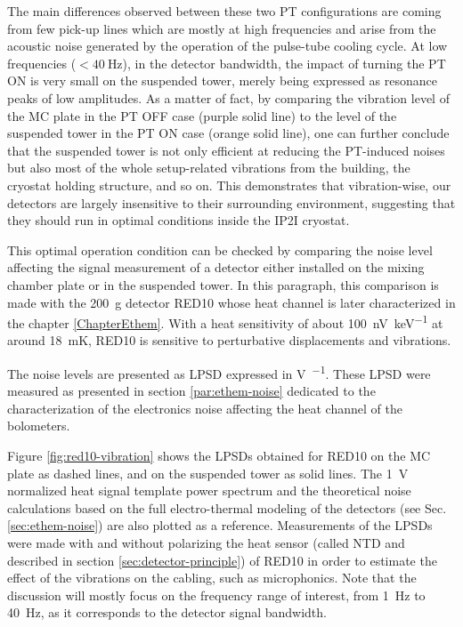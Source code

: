 The main differences observed between these two PT configurations are coming from few pick-up lines which are mostly at high frequencies and arise from the acoustic noise generated by the operation of the pulse-tube cooling cycle.
At low frequencies ($<\SI{40}{\Hz}$), in the detector bandwidth, the impact of turning the PT ON is very small on the suspended tower, merely being expressed as resonance peaks of low amplitudes.
As a matter of fact, by comparing the vibration level of the MC plate in the PT OFF case (purple solid line) to the level of the suspended tower in the PT ON case (orange solid line), one can further conclude that the suspended tower is not only efficient at reducing the PT-induced noises but also most of the whole setup-related vibrations from the building, the cryostat holding structure, and so on.
This demonstrates that vibration-wise, our detectors are largely insensitive to their surrounding environment, suggesting that they should run in optimal conditions inside the IP2I cryostat.

This optimal operation condition can be checked by comparing the noise level affecting the signal measurement of a detector either installed on the mixing chamber plate or in the suspended tower. In this paragraph, this comparison is made with the \SI{200}{\g} detector RED10 whose heat channel is later characterized in the chapter \ref{ChapterEthem}. With a heat sensitivity of about \SI{100}{\nano\volt\per\kilo\eV} at around \SI{18}{\milli\kelvin}, RED10 is sensitive to perturbative displacements and vibrations. 

The noise levels are presented as LPSD expressed in \si{\volt\per\sqrthz}. These LPSD were measured as presented in section \ref{par:ethem-noise} dedicated to the characterization of the electronics noise affecting the heat channel of the bolometers.

Figure \ref{fig:red10-vibration} shows the LPSDs obtained for RED10 on the MC plate as dashed lines, and on the suspended tower as solid lines. The \SI{1}{\volt} normalized heat signal template power spectrum and the theoretical noise calculations based on the full electro-thermal modeling of the detectors (see Sec.\ref{sec:ethem-noise}) are also plotted as a reference. Measurements of the LPSDs were made with and without polarizing the heat sensor (called NTD and described in section \ref{sec:detector-principle}) of RED10 in order to estimate the effect of the vibrations on the cabling, such as microphonics. Note that the discussion will mostly focus on the frequency range of interest, from \SI{1}{\Hz} to \SI{40}{\Hz}, as it corresponds to the detector signal bandwidth.

